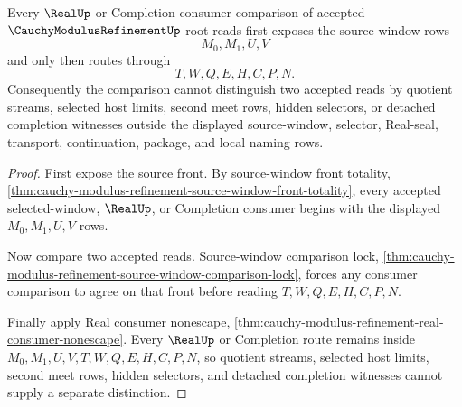 \begin{theorem}
\label{thm:cauchy-modulus-source-window-real-consumer-lock}
Every $\RealUp$ or Completion consumer comparison of accepted $\CauchyModulusRefinementUp$ root reads first exposes the source-window rows
$$
M_0,M_1,U,V
$$
and only then routes through
$$
T,W,Q,E,H,C,P,N.
$$
Consequently the comparison cannot distinguish two accepted reads by quotient streams, selected host limits, second meet rows, hidden selectors, or detached completion witnesses outside the displayed source-window, selector, Real-seal, transport, continuation, package, and local naming rows.
\end{theorem}
\begin{proof}
First expose the source front. By source-window front totality, \autoref{thm:cauchy-modulus-refinement-source-window-front-totality}, every accepted selected-window, $\RealUp$, or Completion consumer begins with the displayed $M_0,M_1,U,V$ rows.

Now compare two accepted reads. Source-window comparison lock, \autoref{thm:cauchy-modulus-refinement-source-window-comparison-lock}, forces any consumer comparison to agree on that front before reading $T,W,Q,E,H,C,P,N$.

Finally apply Real consumer nonescape, \autoref{thm:cauchy-modulus-refinement-real-consumer-nonescape}. Every $\RealUp$ or Completion route remains inside $M_0,M_1,U,V,T,W,Q,E,H,C,P,N$, so quotient streams, selected host limits, second meet rows, hidden selectors, and detached completion witnesses cannot supply a separate distinction.
\end{proof}

